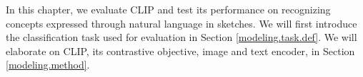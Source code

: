 In this chapter, we evaluate CLIP and test its performance on recognizing concepts expressed through natural language in sketches. We will first introduce the classification task used for evaluation in Section \ref{modeling.task.def}. We will elaborate on CLIP, its contrastive objective, image and text encoder, in Section \ref{modeling.method}.




